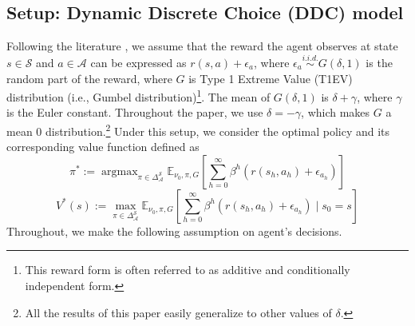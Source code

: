 \subsection{Setup: Dynamic Discrete Choice (DDC) model}
Following the literature \citep{rust1994structural, magnac2002identifying}, we assume that the reward the agent observes at state $s\in\mathcal{S}$ and $a\in\mathcal{A}$ can be expressed as $r(s,a) + \epsilon_a$, 
where $\epsilon_a\overset{i.i.d.}{\sim}  G(\delta, 1)$ is the random part of the reward, where $G$ is Type 1 Extreme Value (T1EV) distribution (i.e., Gumbel distribution)\footnote{This reward form is often referred to as additive and conditionally independent form.}. The mean of $G(\delta, 1)$ is $\delta + \gamma$, where $\gamma$ is the Euler constant. Throughout the paper, we use $\delta=-\gamma$, which makes $G$ a mean 0 distribution.\footnote{All the results of this paper easily generalize to other values of $\delta$.} Under this setup, we consider the optimal policy and its corresponding value function defined as
$$\pi^\ast:=\operatorname{argmax}_{\pi \in \Delta_{\mathcal{A}}^{\mathcal{S}}}\mathbb{E}_{\nu_0,\pi,G}\left[\sum_{h=0}^{\infty} \beta^h( r\left(s_h, a_h\right)+\epsilon_{a_h})\right]$$
$$V^\ast(s):=\operatorname{max}_{\pi \in \Delta_{\mathcal{A}}^{\mathcal{S}}}\mathbb{E}_{\nu_0,\pi,G}\left[\sum_{h=0}^{\infty} \beta^h( r\left(s_h, a_h\right)+\epsilon_{a_h})\mid s_0=s\right]$$
Throughout, we make the following assumption on agent's decisions.

